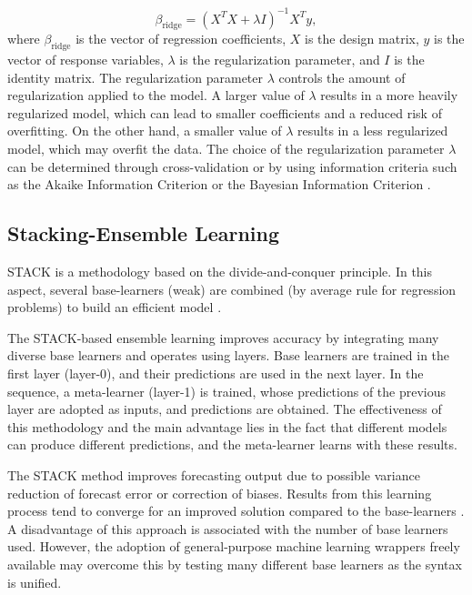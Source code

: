 \begin{equation}
    \beta_{\text{ridge}}=(X^TX + \lambda I)^{-1}X^Ty,
\end{equation}
where $\beta_{\text{ridge}}$ is the vector of regression coefficients, $X$ is the design matrix, $y$ is the vector of response variables, $\lambda$ is the regularization parameter, and $I$ is the identity matrix. The regularization parameter $\lambda$ controls the amount of regularization applied to the model. A larger value of $\lambda$ results in a more heavily regularized model, which can lead to smaller coefficients and a reduced risk of overfitting. On the other hand, a smaller value of $\lambda$ results in a less regularized model, which may overfit the data. The choice of the regularization parameter $\lambda$ can be determined through cross-validation or by using information criteria such as the Akaike Information Criterion or the Bayesian Information Criterion \cite{hoerl1970Ridge}.

\subsection{Stacking-Ensemble Learning}
\ac{STACK} is a methodology based on the divide-and-conquer principle. In this aspect, several base-learners (weak) are combined (by average rule for regression problems) to build an efficient model \cite{mendes-moreira2012Ensemble}. 

The \ac{STACK}-based ensemble learning improves accuracy by integrating many diverse base learners and operates using layers. Base learners are trained in the first layer (layer-0), and their predictions are used in the next layer. In the sequence, a meta-learner (layer-1) is trained, whose predictions of the previous layer are adopted as inputs, and predictions are obtained. The effectiveness of this methodology and the main advantage lies in the fact that different models can produce different predictions, and the meta-learner learns with these results.

The \ac{STACK} method improves forecasting output due to possible variance reduction of forecast error or correction of biases. Results from this learning process tend to converge for an improved solution compared to the base-learners \cite{wolpert1992Stacked}. A disadvantage of this approach is associated with the number of base learners used. However, the adoption of general-purpose machine learning wrappers freely available may overcome this by testing many different base learners as the syntax is unified.

